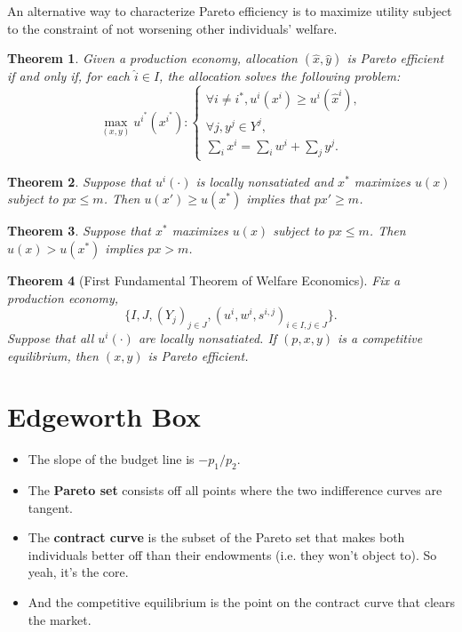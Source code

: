 \documentclass[11pt, twocolumn]{article}
\newtheorem{theorem}{Theorem}
\theoremstyle{definition}
\begin{document}
An alternative way to characterize Pareto efficiency is to maximize utility subject to the constraint of not worsening other individuals' welfare. 

\begin{theorem}
	Given a production economy, allocation $(\hat{x}, \hat{y})$ is Pareto efficient if and only if, for each $\hat{i} \in I$, the allocation solves the following problem:
	\[	
		\max_{(x,y)} u^{i^*}( x^{i^*}) : 
			\begin{cases}
				\forall i \neq i^*, u^i(x^i) \geq u^i(\hat{x}^i),\\
				\forall j, y^j \in Y^j,\\
				\sum_i x^i = \sum_i w^i + \sum_j y^j.
			\end{cases}
	\]	
\end{theorem}


\begin{theorem}
Suppose that $u^i(\cdot)$ is locally nonsatiated and $x^*$ maximizes $u(x)$ subject to $px \leq m$. Then $u(x') \geq u(x^*)$ implies that $px' \geq m$. 
\end{theorem}

\begin{theorem}
	Suppose that $x^*$ maximizes $u(x)$ subject to $px \leq m$. Then $u(x) > u(x^*)$ implies $px > m$. 
\end{theorem}


\begin{theorem}[First Fundamental Theorem of Welfare Economics]
	Fix a production economy, 
		\[			\{ I, J, (Y_j)_{j\in J}, (u^i, w^i, s^{i,j})_{i \in I, j \in J}\}. 	\]
	Suppose that all $u^i(\cdot)$ are locally nonsatiated. If $(p,x,y)$ is a competitive equilibrium, then $(x,y)$ is Pareto efficient.
\end{theorem}



\section*{Edgeworth Box}

\begin{itemize}
	\item The slope of the budget line is $-p_1/p_2$. 
	\item The \textbf{Pareto set} consists off all points where the two indifference curves are tangent.
	\item The \textbf{contract curve} is the subset of the Pareto set that makes both individuals better off than their endowments (i.e. they won't object to). So yeah, it's the core. 
	\item And the competitive equilibrium is the point on the contract curve that clears the market. 
\end{itemize}
\end{document}
